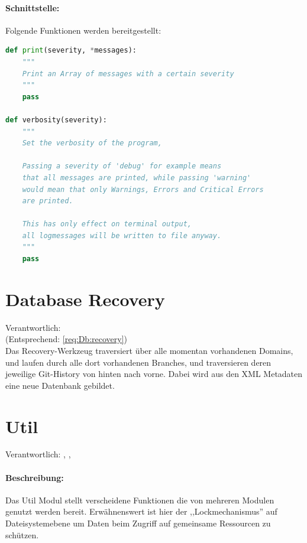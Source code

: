 \paragraph{Schnittstelle:}
\label{par:schnittstelle_}
Folgende Funktionen werden bereitgestellt:
\begin{lstlisting}[language=python]
def print(severity, *messages):
    """
    Print an Array of messages with a certain severity
    """
    pass

def verbosity(severity):
    """
    Set the verbosity of the program, 

    Passing a severity of 'debug' for example means
    that all messages are printed, while passing 'warning'
    would mean that only Warnings, Errors and Critical Errors 
    are printed.

    This has only effect on terminal output,
    all logmessages will be written to file anyway.
    """
    pass
\end{lstlisting}

\section{Database Recovery} 
\label{sec:database_recovery}
Verantwortlich: \ciii 
\\
(Entsprechend: \ref{req:Db:recovery}) \\
Das Recovery-Werkzeug traversiert über alle momentan vorhandenen Domains, und laufen durch alle dort vorhandenen Branches, und traversieren deren 
jeweilige Git-History von hinten nach vorne.
Dabei wird aus den XML Metadaten eine neue Datenbank gebildet.

\section{Util} 
\label{sec:util}
Verantwortlich: \flo, \ci, \ciii

\paragraph{Beschreibung:}
\label{par:beschreibung_}
Das Util Modul stellt verscheidene Funktionen die von mehreren Modulen genutzt werden bereit.
Erwähnenswert ist hier der ,,Lockmechanismus''
auf Dateisystemebene um Daten beim Zugriff auf gemeinsame  Ressourcen zu schützen.

